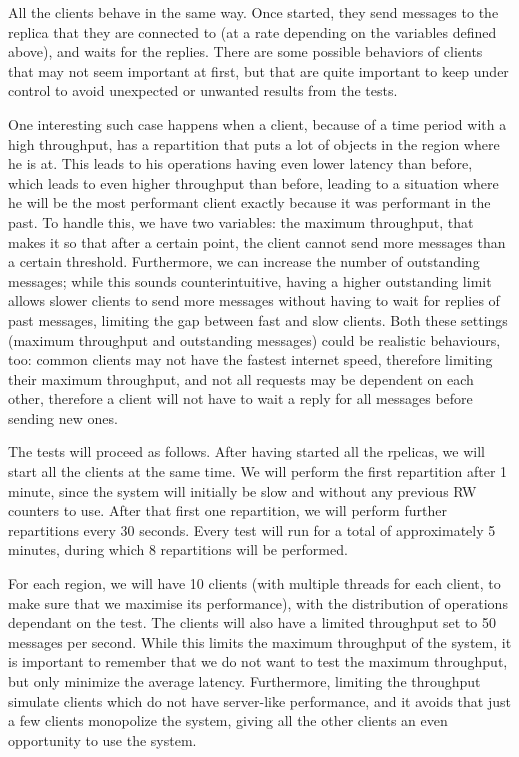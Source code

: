 All the clients behave in the same way. Once started, they send messages to the replica that they are connected to (at a rate depending on the variables defined above), and waits for the replies. There are some possible behaviors of clients that may not seem important at first, but that are quite important to keep under control to avoid unexpected or unwanted results from the tests.

One interesting such case happens when a client, because of a time period with a high throughput, has a repartition that puts a lot of objects in the region where he is at. This leads to his operations having even lower latency than before, which leads to even higher throughput than before, leading to a situation where he will be the most performant client exactly because it was performant in the past. To handle this, we have two variables: the maximum throughput, that makes it so that after a certain point, the client cannot send more messages than a certain threshold. Furthermore, we can increase the number of outstanding messages; while this sounds counterintuitive, having a higher outstanding limit allows slower clients to send more messages without having to wait for replies of past messages, limiting the gap between fast and slow clients. Both these settings (maximum throughput and outstanding messages) could be realistic behaviours, too: common clients may not have the fastest internet speed, therefore limiting their maximum throughput, and not all requests may be dependent on each other, therefore a client will not have to wait a reply for all messages before sending new ones.

The tests will proceed as follows. After having started all the rpelicas, we will start all the clients at the same time. We will perform the first repartition after 1 minute, since the system will initially be slow and without any previous RW counters to use. After that first one repartition, we will perform further repartitions every 30 seconds. Every test will run for a total of approximately 5 minutes, during which 8 repartitions will be performed.

For each region, we will have 10 clients (with multiple threads for each client, to make sure that we maximise its performance), with the distribution of operations dependant on the test. The clients will also have a limited throughput set to 50 messages per second. While this limits the maximum throughput of the system, it is important to remember that we do not want to test the maximum throughput, but only minimize the average latency. Furthermore, limiting the throughput simulate clients which do not have server-like performance, and it avoids that just a few clients monopolize the system, giving all the other clients an even opportunity to use the system.

